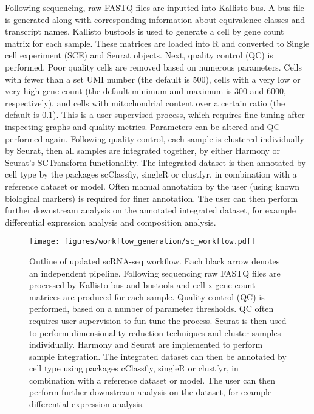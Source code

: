 Following sequencing, raw FASTQ files are inputted into Kallisto bus.
A bus file is generated along with corresponding information about equivalence classes and transcript names.
Kallisto bustools is used to generate a cell by gene count matrix for each sample.
These matrices are loaded into R and converted to Single cell experiment (SCE) and Seurat objects.
Next, quality control (QC) is performed.
Poor quality cells are removed based on numerous parameters.
Cells with fewer than a set UMI number (the default is 500), cells with a very low or very high gene count (the default minimum and maximum is 300 and 6000, respectively), and cells with mitochondrial content over a certain ratio (the default is 0.1).
This is a user-supervised process, which requires fine-tuning after inspecting graphs and quality metrics.
Parameters can be altered and QC performed again.
Following quality control, each sample is clustered individually by Seurat, then all samples are integrated together, by either Harmony or Seurat's SCTransform functionality.
The integrated dataset is then annotated by cell type by the packages scClassfiy, singleR or clustfyr, in combination with a reference dataset or model.
Often manual annotation by the user (using known biological markers) is required for finer annotation.
The user can then perform further downstream analysis on the annotated integrated dataset, for example differential expression analysis and composition analysis.

\begin{figure}[p]
\centering
\texttt{[image: figures/workflow\_generation/sc\_workflow.pdf]}
\caption[Updated scRNA-seq workflow]{Outline of updated scRNA-seq workflow.
Each black arrow denotes an independent pipeline.
Following sequencing raw FASTQ files are processed by Kallisto bus and bustools and cell x gene count matrices are produced for each sample.
Quality control (QC) is performed, based on a number of parameter thresholds.
QC often requires user supervision to fun-tune the process.
Seurat is then used to perform dimensionality reduction techniques and cluster samples individually.
Harmony and Seurat are implemented to perform sample integration.
The integrated dataset can then be annotated by cell type using packages cClassfiy, singleR or clustfyr, in combination with a reference dataset or model.
The user can then perform further downstream analysis on the dataset, for example differential expression analysis.
}
\label{fig:updated_sc_workflow}
\end{figure}

